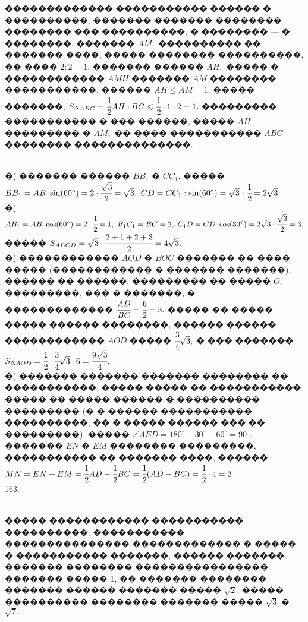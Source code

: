 \documentclass[12pt]{article}
\begin{document}
������������� ����������� ������ � ����������, ������� ������� �������� �������� ��� ����������, � �������� --- � ��������. ������� $AM,$ ���������� �� ������� ����, ����� �������� ����������, �� ���� $2:2=1.$ ������� ������ $AH,$ ����� � ������������ $AMH$ ������� $AM$ �������� �����������, ������ $AH\leqslant AM=1.$ ����� �������, $S_{\Delta ABC}=\cfrac{1}{2}AH\cdot BC \leqslant \cfrac{1}{2}\cdot 1 \cdot 2=1.$ ��������� ����������� � ��� ������, ����� $AH$ ��������� � $AM,$ �� ���� ����������� $ABC$ �������� ��������������.\newpage{}. \begin{figure}[ht!]
\end{figure}\\
�) ������� ������ $BB_1$ � $CC_1.$ ����� $BB_1=AB\ \sin(60^\circ)=2\cdot \cfrac{\sqrt{3}}{2}=\sqrt{3},\ CD=CC_1:\sin(60^\circ)=\sqrt{3}:\cfrac{1}{2}=2\sqrt{3}.$\\
�) $AB_1=AB\ \cos(60^\circ)=2 \cdot \cfrac{1}{2}=1,\ B_1C_1=BC=2,\ C_1D=CD\ \cos(30^\circ)=2\sqrt{3}\cdot \cfrac{\sqrt{3}}{2}=3.$ ����� $S_{ABCD}=\sqrt{3}\cdot\cfrac{2+1+2+3}{2}=4\sqrt{3}.$\\
�) ������������ $AOD$ � $BOC$ ������� �� ���� ����� (������������ � ������� �������), ������ �� ������, ��������� �� ����� $O,$ ���������, ��� � �������, � ������������� $\cfrac{AD}{BC}=\cfrac{6}{2}=3.$ ����� �� ����� ����� ������ ��������, ������ ������ ������������ $AOD$ ����� $\cfrac{3}{4}\sqrt{3},$ � ��� ������� $S_{\Delta AOD}=\cfrac{1}{2}\cdot\cfrac{3}{4}\sqrt{3}\cdot6=\cfrac{9\sqrt{3}}{4}.$\\
�) ������� ������� ������� �������� �� �����������, ����� ����� �� ����������� ����� �� ����� ������ � ���������� ��������� (� � ������ ����������� ����������, �� � ����� ������ ��� �� ���������). ����� $\angle AED=180^\circ-30^\circ-60^\circ=90^\circ.$ ������� $EN$ � $EM$ �������� ���������, ����������� �� ������� ����, ������ $MN=EN-EM=\cfrac{1}{2}AD-\cfrac{1}{2}BC=\cfrac{1}{2}(AD-BC)=\cfrac{1}{2}\cdot4=2$.\\
163. \begin{figure}[ht!]
\end{figure}\\
����� ������������ ����������� ����������, ����������� ��������������� ������������� � ����� � ����������� �������, ������ �������. ������� �������� ���������������� ������� ����� 1, �� ������� �������� ������� ������ ������� ����� $\sqrt{2}.$ ����� ���������� �������� ������� ����� $\sqrt{3}$ � $\sqrt{7}.$\newpage\noindent
\end{document}

